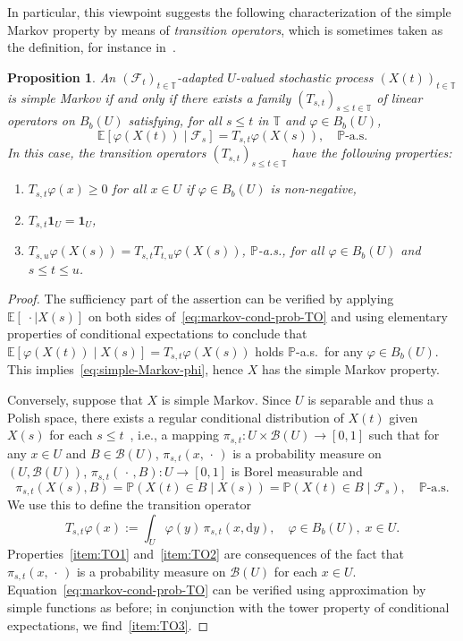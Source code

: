 \documentclass[reqno]{amsart}
\numberwithin{equation}{section}
\newcommand{\bbP}{\mathbb{P}}
\newcommand{\bbT}{\mathbb{T}}
\newcommand{\E}{\mathbb{E}}
\newcommand{\cB}{\mathcal{B}}
\newcommand{\cF}{\mathcal{F}}
\newcommand{\from}{\colon}
\newtheorem{proposition}[lemma]{Proposition}
\theoremstyle{remark}
\theoremstyle{definition}
\begin{document}
In particular, this viewpoint suggests the following characterization of the simple Markov property
by means of \emph{transition operators}, which is sometimes taken as the definition, 
for instance in~\cite[Chapter~III, Definition~1.3]{RevuzYor1999}.

\begin{proposition}\label{def:markov-TO}
	An $(\cF_t)_{t\in\bbT}$-adapted $U$-valued
	stochastic process $(X(t))_{t\in\bbT}$ 
	is simple Markov if and only if there
	exists a family $(T_{s,t})_{s \le t \in \bbT}$ 
	of linear operators on $B_b(U)$ satisfying, 
	for all $s \le t$ in $\bbT$ and $\varphi \in B_b(U)$,
	\begin{equation}\label{eq:markov-cond-prob-TO}
		\E[\varphi(X(t)) \mid \cF_s] = T_{s,t} \varphi(X(s)),
		\quad 
		\bbP\text{-a.s.}
	\end{equation}
	In this case, the \emph{transition operators} $(T_{s,t})_{s \le t \in \bbT}$ have the following properties:
	\begin{enumerate}[label=(TO\arabic{*})]
		\item $T_{s,t}\varphi(x) \ge 0$ for all $x \in U$ if $\varphi \in B_b(U)$ is non-negative,
		\label{item:TO1}
		\item $T_{s,t}\mathbf 1_U = \mathbf 1_U$,\label{item:TO2}
		\item $T_{s,u} \varphi(X(s)) = T_{s,t} T_{t,u}\varphi(X(s))$\label{item:TO3}, $\bbP$-a.s., 
		for all $\varphi \in B_b(U)$ and $s \le t \le u$.
	\end{enumerate}
\end{proposition}
%
\begin{proof}
	The sufficiency part of the assertion can be verified by applying 
	$\E[\; \cdot \mid X(s)]$
	on both sides of~\eqref{eq:markov-cond-prob-TO} and using
	elementary properties of conditional expectations to conclude that
	$\E[\varphi(X(t)) \mid X(s)]=T_{s,t} \varphi(X(s))$ holds 
	$\bbP$-a.s.\ for any $\varphi \in B_b(U)$.
	This implies~\eqref{eq:simple-Markov-phi}, hence $X$ has the simple Markov property.
	
	Conversely, suppose that $X$ is simple Markov. 
	Since $U$ is separable 
	and thus a Polish space, there exists a regular conditional 
	distribution of $X(t)$ given $X(s)$
	for each $s \le t$~\cite[Theorem~8.5]{Kallenberg2002},
	i.e., a mapping
	$\pi_{s,t} \from U \times \cB(U) \to [0,1]$ such that
	for any $x \in U$ and $B \in \cB(U)$,
	$\pi_{s,t}(x, \,\cdot\,)$ is a probability measure on $(U, \cB(U))$,
	$\pi_{s,t}(\,\cdot\,, B) \from U \to [0,1]$ is Borel measurable
	and 
	\[
	\pi_{s,t}(X(s), B) 
	= 
	\bbP(X(t) \in B \mid X(s))
	=
	\bbP(X(t) \in B \mid \cF_s),
	\quad
	\bbP\text{-a.s.}
	\]
	We  use this to define the transition operator
	\[
	T_{s,t} \varphi(x) 
	:=
	\int_U \varphi(y) \, \pi_{s,t}(x, \mathrm d y),
	\quad
	\varphi \in B_b(U), \; x \in U.
	\]
	Properties~\ref{item:TO1} and~\ref{item:TO2} are consequences of the fact that
	$\pi_{s,t}(x, \,\cdot\,)$ is a probability measure on $\cB(U)$ for each $x \in U$.
	Equation~\eqref{eq:markov-cond-prob-TO} 
	can be verified using approximation by simple functions as before;
	in conjunction with the tower property 
	of conditional expectations, we find~\ref{item:TO3}.
\end{proof}
\end{document}
